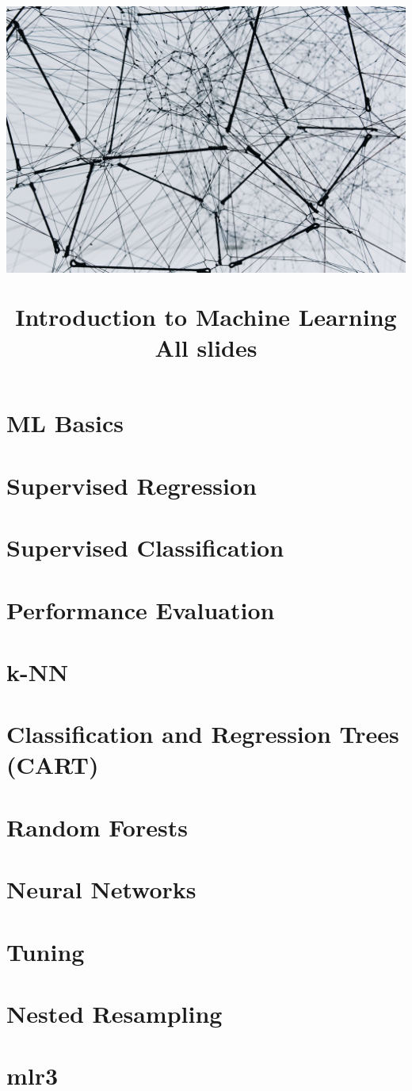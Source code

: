 \documentclass[11pt,compress]{beamer}
\title{
\centerline{\includegraphics[width=0.75\paperwidth,keepaspectratio, trim={0 15cm 0 5cm}, clip]{titlepage.jpg}}
\medskip
Introduction to Machine Learning \\
\medskip
\small All slides
}
\begin{document}

\begin{frame}
\maketitle
\end{frame}



\section{ML Basics}


\section{Supervised Regression}


\section{Supervised Classification}


\section{Performance Evaluation}


\section{k-NN}


\section{Classification and Regression Trees (CART)}


\section{Random Forests}


\section{Neural Networks}


\section{Tuning}


\section{Nested Resampling}


\section{mlr3}

\end{document}
